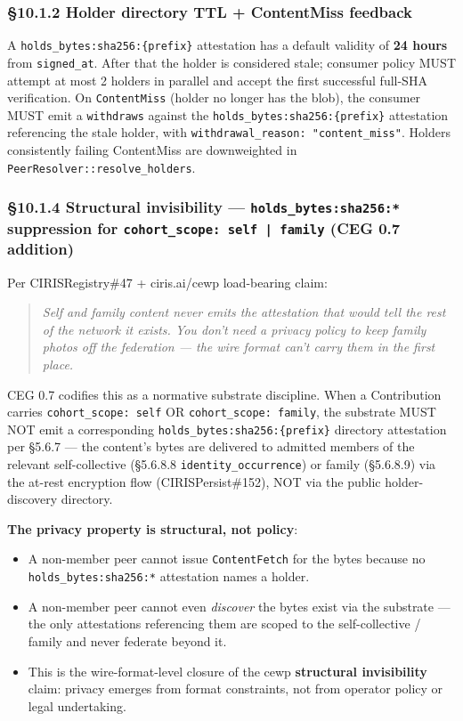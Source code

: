 \documentclass[10pt]{article}
\begin{document}
\subsubsection*{§10.1.2 Holder directory TTL + ContentMiss feedback}


A \texttt{holds\_bytes:sha256:\{prefix\}} attestation has a default validity of \textbf{24 hours} from \texttt{signed\_at}. After that the holder is considered stale; consumer policy MUST attempt at most 2 holders in parallel and accept the first successful full-SHA verification. On \texttt{ContentMiss} (holder no longer has the blob), the consumer MUST emit a \texttt{withdraws} against the \texttt{holds\_bytes:sha256:\{prefix\}} attestation referencing the stale holder, with \texttt{withdrawal\_reason: "content\_miss"}. Holders consistently failing ContentMiss are downweighted in \texttt{PeerResolver::resolve\_holders}.


\subsubsection*{§10.1.4 Structural invisibility — \texttt{holds\_bytes:sha256:*} suppression for \texttt{cohort\_scope: self | family} (CEG 0.7 addition)}


Per CIRISRegistry\#47 + ciris.ai/cewp load-bearing claim:


\begin{quote}\itshape Self and family content never emits the attestation that would tell the rest of the network it exists. You don't need a privacy policy to keep family photos off the federation — the wire format can't carry them in the first place.\end{quote}


CEG 0.7 codifies this as a normative substrate discipline. When a Contribution carries \texttt{cohort\_scope: self} OR \texttt{cohort\_scope: family}, the substrate MUST NOT emit a corresponding \texttt{holds\_bytes:sha256:\{prefix\}} directory attestation per §5.6.7 — the content's bytes are delivered to admitted members of the relevant self-collective (§5.6.8.8 \texttt{identity\_occurrence}) or family (§5.6.8.9) via the at-rest encryption flow (CIRISPersist\#152), NOT via the public holder-discovery directory.


\textbf{The privacy property is structural, not policy}:


\begin{itemize}\setlength\itemsep{0pt}
\item A non-member peer cannot issue \texttt{ContentFetch} for the bytes because no \texttt{holds\_bytes:sha256:*} attestation names a holder.
\item A non-member peer cannot even \textit{discover} the bytes exist via the substrate — the only attestations referencing them are scoped to the self-collective / family and never federate beyond it.
\item This is the wire-format-level closure of the cewp \textbf{structural invisibility} claim: privacy emerges from format constraints, not from operator policy or legal undertaking.
\end{itemize}
\end{document}

